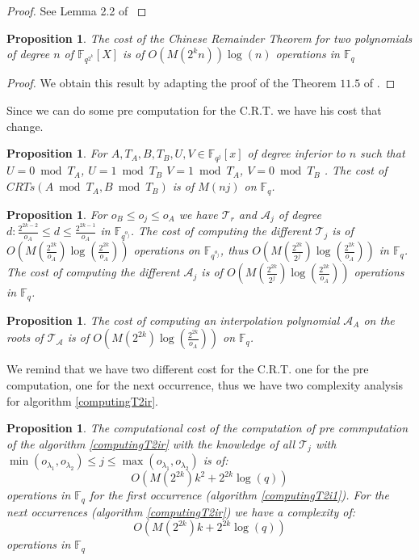 \documentclass{lms}
\newtheorem{prop}[thm]{Proposition}
\begin{document}
\begin{proof}
See Lemma 2.2 of \cite{DBLP:journals/cc/GathenS92}
\end{proof}

\begin{prop}
The cost of the Chinese Remainder Theorem for two polynomials of degree $n$ of $\mathbb{F}_{q^{2^k}}[X] $ is of $O(M(2^kn))\log(n)$ operations in $\mathbb{F}_q$
\end{prop}

\begin{proof}
We obtain this result by adapting the proof of the Theorem $11.5$ of \cite{DBLP:books/daglib/0010544}.
\end{proof}

Since we can do some pre computation for the C.R.T. we have his cost that change. 

\begin{prop}
For $A, T_A,B, T_B,U,V \in \mathbb{F}_{q^{j}}[x]$ of degree inferior to $n$ such that $U=0 \bmod T_A$, $U=1 \bmod T_B$ $V=1 \bmod T_A$, $V=0 \bmod T_B$ . The cost of $CRTs(A \bmod T_A,B\bmod T_B)$ is of $M(nj)$ on $\mathbb{F}_q$.
\end{prop}

\begin{prop}
For $ o_{B} \leqslant o_j \leqslant o_{A}$ we have $\mathcal{T}_r$ and $\mathcal{A}_j$ of degree $d: \frac{2^{2k-2}}{o_{A}}  \leqslant d \leqslant \frac{2^{2k-1}}{o_{A}}$ in $\mathbb{F}_{q^{o_j}}$. The cost of computing the different $\mathcal{T}_j$ is of $O(M(\frac{2^{2k}}{o_{A}})\log(\frac{2^{2k}}{o_{A}}))$ operations on $\mathbb{F}_{q^{o_j}}$, thus $O(M(\frac{2^{2k}}{2^j})\log(\frac{2^{2k}}{o_{A}}))$ in $\mathbb{F}_q$. The cost of computing the different $\mathcal{A}_j$ is of $O(M(\frac{2^{2k}}{2^j})\log(\frac{2^{2k}}{o_{A}}))$ operations in $\mathbb{F}_q$.
\end{prop}


\begin{prop}
The cost of computing an interpolation polynomial $\mathcal{A}_{A}$  on the roots of $\mathcal{T_{A}}$  is of $O(M(2^{2k})\log(\frac{2^{2k}}{o_{A}}))$ on $\mathbb{F}_q$.
\end{prop}

We remind that we have two different cost for the C.R.T. one for the pre computation, one for the next occurrence, thus we have two complexity analysis for algorithm \ref{computingT2ir}.

\begin{prop} %
The computational cost of the computation of pre commputation of the algorithm \ref{computingT2ir} with the knowledge of all $\mathcal{T}_j$ with $  \min(o_{\lambda_1 },o_{\lambda_2 }) \leqslant j \leqslant \max(o_{\lambda_1},o_{\lambda_2})$  is of:
\[
O(M(2^{2k})k^2+ 2^{2k}\log(q))
\]
operations in $\mathbb{F}_q$ for the first occurrence (algorithm \ref{computingT2i1}). For the next occurrences (algorithm \ref{computingT2ir}) we have a complexity of:
\[
O(M(2^{2k})k+2^{2k}\log(q))
\]
operations in $\mathbb{F}_q$
\end{prop}
\end{document}
